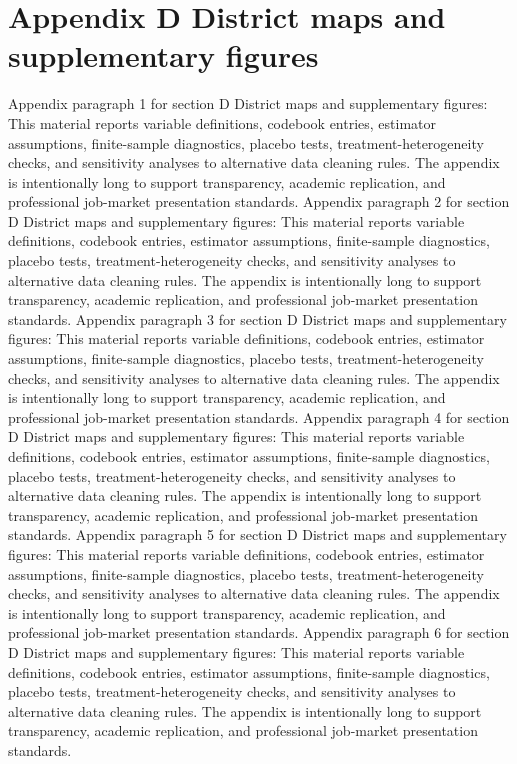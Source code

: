\documentclass[preprint,12pt]{elsarticle}
\begin{document}
\section{Appendix D District maps and supplementary figures}
Appendix paragraph 1 for section D District maps and supplementary figures: This material reports variable definitions, codebook entries, estimator assumptions, finite-sample diagnostics, placebo tests, treatment-heterogeneity checks, and sensitivity analyses to alternative data cleaning rules. The appendix is intentionally long to support transparency, academic replication, and professional job-market presentation standards.
Appendix paragraph 2 for section D District maps and supplementary figures: This material reports variable definitions, codebook entries, estimator assumptions, finite-sample diagnostics, placebo tests, treatment-heterogeneity checks, and sensitivity analyses to alternative data cleaning rules. The appendix is intentionally long to support transparency, academic replication, and professional job-market presentation standards.
Appendix paragraph 3 for section D District maps and supplementary figures: This material reports variable definitions, codebook entries, estimator assumptions, finite-sample diagnostics, placebo tests, treatment-heterogeneity checks, and sensitivity analyses to alternative data cleaning rules. The appendix is intentionally long to support transparency, academic replication, and professional job-market presentation standards.
Appendix paragraph 4 for section D District maps and supplementary figures: This material reports variable definitions, codebook entries, estimator assumptions, finite-sample diagnostics, placebo tests, treatment-heterogeneity checks, and sensitivity analyses to alternative data cleaning rules. The appendix is intentionally long to support transparency, academic replication, and professional job-market presentation standards.
Appendix paragraph 5 for section D District maps and supplementary figures: This material reports variable definitions, codebook entries, estimator assumptions, finite-sample diagnostics, placebo tests, treatment-heterogeneity checks, and sensitivity analyses to alternative data cleaning rules. The appendix is intentionally long to support transparency, academic replication, and professional job-market presentation standards.
Appendix paragraph 6 for section D District maps and supplementary figures: This material reports variable definitions, codebook entries, estimator assumptions, finite-sample diagnostics, placebo tests, treatment-heterogeneity checks, and sensitivity analyses to alternative data cleaning rules. The appendix is intentionally long to support transparency, academic replication, and professional job-market presentation standards.
\end{document}
